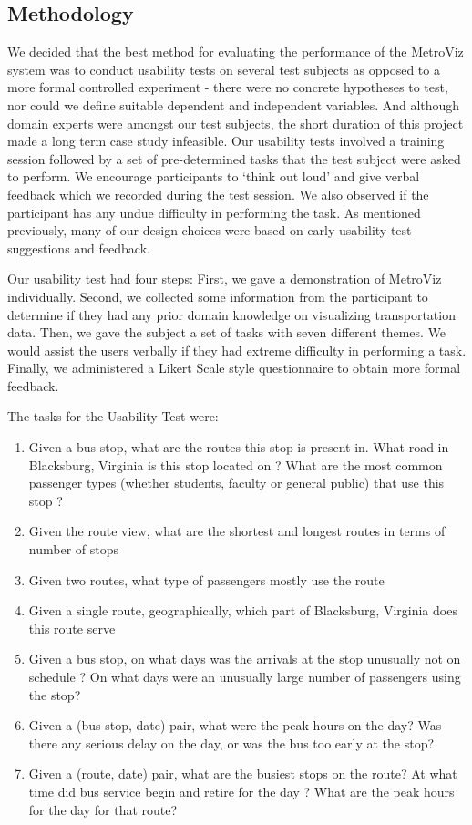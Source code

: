 \documentclass[journal]{vgtc}                %
\begin{document}
\subsection{Methodology}
We decided that the best method for evaluating the performance of the MetroViz system was to conduct usability tests on several test subjects as opposed to a more formal controlled experiment - there were no concrete hypotheses to test, nor could we define suitable dependent and independent variables. And although domain experts were amongst our test subjects, the short duration of this project made a long term case study infeasible. Our usability tests involved a training session followed by a set of pre-determined tasks that the test subject were asked to perform. We encourage participants to `think out loud' and give verbal feedback which we recorded during the test session. We also observed if the participant has any undue difficulty in performing the task. As mentioned previously, many of our design choices were based on early usability test suggestions and feedback.

Our usability test had four steps: First, we gave a demonstration of MetroViz individually. Second, we collected some information from the participant to determine if they had any prior domain knowledge on visualizing transportation data. Then, we gave the subject a set of tasks with seven different themes. We would assist the users verbally if they had extreme difficulty in performing a task. Finally, we administered a Likert Scale style questionnaire to obtain more formal feedback. 

The tasks for the Usability Test were: 
\begin{enumerate}
  \item Given a bus-stop, what are the routes this stop is present in. What road in Blacksburg, Virginia is this stop located on ? What are the most common passenger types (whether students, faculty or general public) that use this stop ?
  \item Given the route view, what are the shortest and longest routes in terms of number of stops
  \item Given two routes, what type of passengers mostly use the route
  \item Given a single route, geographically, which part of Blacksburg, Virginia does this route serve
  \item Given a bus stop, on what days was the arrivals at the stop unusually not on schedule ? On what days were an unusually large number of passengers using the stop?
  \item Given a (bus stop, date) pair, what were the peak hours on the day? Was there any serious delay on the day, or was the bus too early at the stop?
  \item Given a (route, date) pair, what are the busiest stops on the route? At what time did bus service begin and retire for the day ? What are the peak hours for the day for that route?
\end{enumerate}
\end{document}
